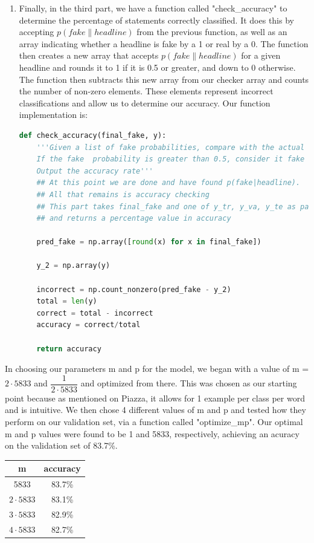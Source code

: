 \documentclass{article}
\begin{document}
\begin{enumerate}
\item 
Finally, in the third part, we have a function called "check\_accuracy" to determine the percentage of statements correctly classified. It does this by accepting $p(fake\|headline)$ from the previous function,
as well as an array indicating whether a headline is fake by a 1 or real by a 0. The function then creates a new array that accepts  $p(fake\|headline)$ for a given headline and rounds it to 1 if it is 0.5 or greater, and down to 0 otherwise.
The function then subtracts this new array from our checker array and counts the number of non-zero elements. These elements represent incorrect classifications and allow us to determine our accuracy.
Our function  implementation is:
\begin{lstlisting}[language=Python]
def check_accuracy(final_fake, y):
    '''Given a list of fake probabilities, compare with the actual results by rounding.
    If the fake  probability is greater than 0.5, consider it fake and if less, consider it real.
    Output the accuracy rate'''
    ## At this point we are done and have found p(fake|headline).
    ## All that remains is accuracy checking
    ## This part takes final_fake and one of y_tr, y_va, y_te as parameters
    ## and returns a percentage value in accuracy

    pred_fake = np.array([round(x) for x in final_fake])
    
    y_2 = np.array(y)
    
    incorrect = np.count_nonzero(pred_fake - y_2)
    total = len(y)
    correct = total - incorrect
    accuracy = correct/total    
    
    return accuracy

  \end{lstlisting}





\end{enumerate}

In choosing our parameters m and p for the model, we began with a value of m = $2 \cdot 5833 $ and $ \dfrac {1}{2 \cdot 5833}$ and optimized from there. This was chosen as our starting point because as mentioned on Piazza, it allows for
1 example per class per word and is intuitive. We then chose 4 different values of m and p and tested how they perform on our validation set, via a function called "optimize\_mp". Our optimal m and p values were found to be 1 and 5833, respectively, achieving an acuracy on the validation set of 83.7\%. 
\begin{center}
\begin{tabular}{ |c|c| } 
 \hline
 m & accuracy \\ [0.5ex] 
\hline \hline
 5833 & 83.7\% \\ 
 $2 \cdot 5833$ & 83.1\% \\ 
 $3 \cdot 5833$ & 82.9\%  \\
 $4 \cdot 5833$ & 82.7\%  \\ 
 \hline
\end{tabular}
\end{center}
\end{document}
